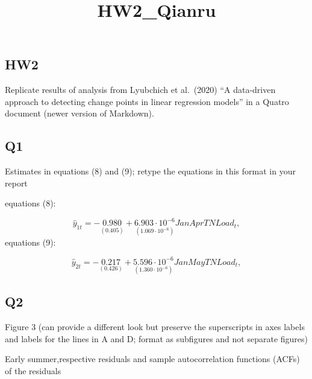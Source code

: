 \documentclass[
  letterpaper,
  DIV=11,
  numbers=noendperiod]{scrartcl}
\title{HW2\_Qianru}
\author{}
\date{}
\begin{document}
\maketitle
\ifdefined\Shaded\renewenvironment{Shaded}{\begin{tcolorbox}[borderline west={3pt}{0pt}{shadecolor}, breakable, enhanced, interior hidden, sharp corners, boxrule=0pt, frame hidden]}{\end{tcolorbox}}\fi

\hypertarget{hw2}{%
\subsection{HW2}\label{hw2}}

Replicate results of analysis from Lyubchich et al.~(2020) ``A
data-driven approach to detecting change points in linear regression
models'' in a Quatro document (newer version of Markdown).

\hypertarget{q1}{%
\subsection{Q1}\label{q1}}

Estimates in equations (8) and (9); retype the equations in this format
in your report

equations (8):

\[
\hat{y}_{1t}=-\underset{(0.405)}{\mathrm{0.980}}+\underset{(1.069·10^{-6})}{\mathrm{6.903·10^{−6}}}JanAprTNLoad_t,
\] equations (9):

\[
\hat{y}_{2t}=-\underset{(0.426)}{\mathrm{0.217}}+\underset{(1.360·10^{-6})}{\mathrm{5.596·10^{−6}}}JanMayTNLoad_t,
\]

\hypertarget{q2}{%
\subsection{Q2}\label{q2}}

Figure 3 (can provide a different look but preserve the superscripts in
axes labels and labels for the lines in A and D; format as subfigures
and not separate figures)

Early summer,respective residuals and sample autocorrelation functions
(ACFs) of the residuals
\end{document}
